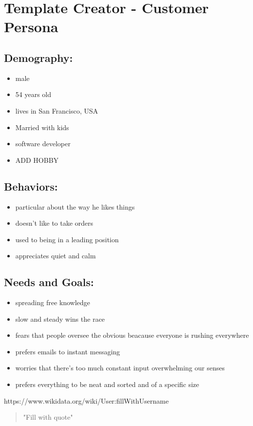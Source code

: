 \documentclass{article}
\date{02.12.2015}
\begin{document}
\section{Template Creator - Customer Persona}

\subsection{Demography:}
\begin{itemize}
 \item male
 \item 54 years old
 \item lives in San Francisco, USA
 \item Married with kids
 \item software developer 
 \item ADD HOBBY
\end{itemize}

\subsection{Behaviors:}
\begin{itemize}
\item particular about the way he likes things
\item doesn't like to take orders
\item used to being in a leading position
\item appreciates quiet and calm
\end{itemize}

\subsection{Needs and Goals:}
\begin{itemize}
 \item spreading free knowledge
 \item slow and steady wins the race
 \item fears that people oversee the obvious beacause everyone is rushing everywhere
 \item prefers emails to instant messaging
 \item worries that there's too much constant input overwhelming our senses 
 \item prefers everything to be neat and sorted and of a specific size
\end{itemize}

\pagebreak

https://www.wikidata.org/wiki/User:fillWithUsername
\begin{quote}
"Fill with quote"
\end{quote}
\end{document}
